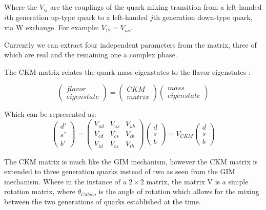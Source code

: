 \documentclass[12pt,a4paper]{article}
\begin{document}
Where the $ V_{ij}$ are the couplings of the quark mixing transition from a left-handed $i$th generation up-type quark to a left-handed $j$th generation down-type quark, via W exchange. For example: $V_{12} = V_{us}$.
  
Currently we can extract four independent parameters from the matrix, three of which are real and the remaining one a complex phase. 

The CKM matrix relates the quark mass eigenstates to the flavor eigenstates :

\[
 \left(
 \begin{array}{c}
 flavor \\
 eigenstate
 \end{array}
 \right)
 =
  \left(
 \begin{array}{c}
  CKM \\
 matrix
 \end{array}
 \right)
  \left(
 \begin{array}{c}
  mass \\
 eigenstate
  \end{array}
 \right)
\]

Which can be represented as:
 \[
 \left(
 \begin{array}{c}
 d' \\
 s' \\
 b'
 \end{array}
 \right)
 =
 \left(
 \begin{array}{ccc}
  V_{ud} & V_{us} & V_{ub} \\
  V_{cd} & V_{cs} & V_{cb} \\
  V_{td} & V_{ts} & V_{tb}
 \end{array}
 \right)
 \left(
 \begin{array}{c}
  d \\
  s \\  b
 \end{array}
 \right)
 =
 V_{CKM}
  \left(
 \begin{array}{c}
 d \\
 s \\
 b
 \end{array}
 \right)
 \]
 
The CKM matrix is much like the GIM mechanism, however the CKM matrix is extended to three generation quarks instead of two as seen from the GIM mechanism. Where in the instance of a $2 \times 2$ matrix, the matrix V is a simple rotation matrix, where $\theta_{Cabibo}$ is the angle of rotation which allows for the mixing between the two generations of quarks established at the time.
\end{document}
